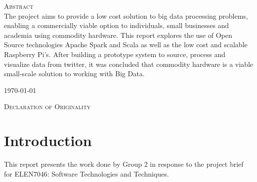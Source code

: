 \documentclass[12pt]{article} %
\begin{document}
\begin{titlepage}
		\begin{flushleft}\large
			\textsc{Abstract}\\
			The project aims to provide a low cost solution to big data processing problems, enabling a commercially viable option to individuals, small businesses and academia using commodity hardware. This report explores the use of  Open Source technologies Apache Spark and Scala as well as the low cost and scalable Raspberry Pi's. After building a prototype system to source, process and visualize data from twitter, it was concluded that  commodity hardware is a viable small-scale solution to working with Big Data.
			
		\end{flushleft}
		{\large \today}\\[3cm] %
		
		
		\vfill %
		
	\end{titlepage}
	
		\begin{flushleft}\large
			\textsc{Declaration of Originality}\\
			
			
		\end{flushleft}
	
	
	\tableofcontents %
	
	\newpage %
	
	
	\section{Introduction} %
	
This report presents the work done by Group 2 in response to the project brief for ELEN7046: Software Technologies and Techniques.\\
\end{document}
